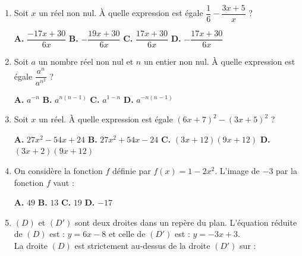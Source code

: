 \documentclass[a4paper,11pt]{article}
\begin{document}
\begin{seance}{} %

\begin{enumerate}
\item Soit $x$ un réel non nul. À quelle expression est égale $\dfrac{1}{6}-\dfrac{3x+5}{x}$ ?

\medskip
\begin{center}
\textbf{\textcolor{Couleur1}{A.}} $\dfrac{-17x +30}{6x}$ \qquad \textbf{\textcolor{Couleur1}{B.}} $-\dfrac{19x +30}{6x}$ \qquad \textbf{\textcolor{Couleur1}{C.}} $\dfrac{17x +30}{6x}$ \qquad \textbf{\textcolor{Couleur1}{D.}} $-\dfrac{17x +30}{6x}$
\end{center}


\item Soit $a$ un nombre réel non nul et $n$ un entier non nul. À quelle expression est égale $\dfrac{a^{n}}{a^{n^{2}}}$ ?

\medskip
\begin{center}
\textbf{\textcolor{Couleur1}{A.}} $a^{-n}$ \qquad \textbf{\textcolor{Couleur1}{B.}} $a^{n(n^{}-1)}$ \qquad \textbf{\textcolor{Couleur1}{C.}} $a^{1-n}$ \qquad \textbf{\textcolor{Couleur1}{D.}} $a^{-n(n^{}-1)}$
\end{center}


\item Soit $x$ un réel. À quelle expression est égale $\left(6x+7\right)^2-\left(3x+5\right)^2$ ?

\medskip
\begin{center}
\textbf{\textcolor{Couleur1}{A.}} $27x^{2}-54x+24$ \qquad \textbf{\textcolor{Couleur1}{B.}} $27x^{2}+54x-24$ \qquad \textbf{\textcolor{Couleur1}{C.}} $\left(3x+12\right)\left(9x+12\right)$ \qquad \textbf{\textcolor{Couleur1}{D.}} $\left(3x+2\right)\left(9x+12\right)$
\end{center}


\item On considère  la fonction $f$ définie par  $f(x)= 1-2x^2$. L'image de $-3$ par la fonction $f$ vaut :

\medskip
\begin{center}
\textbf{\textcolor{Couleur1}{A.}} $49$ \qquad \textbf{\textcolor{Couleur1}{B.}} $13$ \qquad \textbf{\textcolor{Couleur1}{C.}} $19$ \qquad \textbf{\textcolor{Couleur1}{D.}} $-17$
\end{center}


\item $(D)$ et $(D')$ sont deux droites dans un repère du plan. L'équation réduite de $(D)$ est : $y=6x-8$ et celle de $(D')$ est : $y=-3x+3$.\\
    La droite $(D)$ est strictement au-dessus de la droite $(D')$ sur :


\end{enumerate}
\end{seance}
\end{document}
